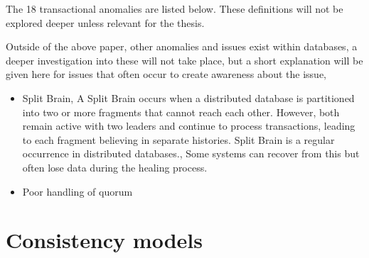 \documentclass[a4paper,10pt,titlepage]{report}
\begin{document}
The 18 transactional anomalies are listed below. These definitions will not be explored deeper unless relevant for the thesis.

\vspace{2mm}

\vspace{2mm}

Outside of the above paper, other anomalies and issues exist within databases, a deeper investigation into these will not take place, but a short explanation will be given here for issues that often occur to create awareness about the issue,
\begin{itemize}
    \item Split Brain, A Split Brain occurs when a distributed database is partitioned into two or more fragments that cannot reach each other. However, both remain active with two leaders and continue to process transactions, leading to each fragment believing in separate histories. Split Brain is a regular occurrence in distributed databases.\cite{aphyrelasticsearch, jepsenscylla, jepsenhazelcast}, Some systems can recover from this but often lose data during the healing process.
    \item Poor handling of quorum
\end{itemize}

\newpage
\section{Consistency models}
\end{document}
